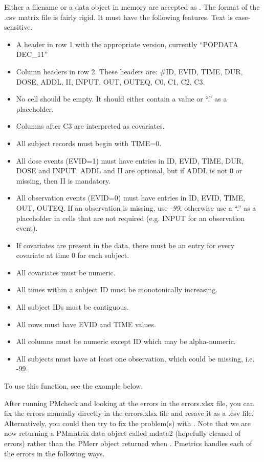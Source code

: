 \documentclass[a4paper]{book}
\begin{document}
\begin{Details}\relax
Either a filename or a data object in memory are accepted as .
The format of the .csv matrix file is fairly rigid.
It must have the following features.  Text is case-sensitive.
\begin{itemize}

\item{} A header in row 1 with the appropriate version, currently ``POPDATA DEC\_11''
\item{} Column headers in row 2.  These headers are: \#ID, EVID, TIME, DUR, DOSE, ADDL, II, INPUT, OUT, OUTEQ,
C0, C1, C2, C3.
\item{} No cell should be empty.  It should either contain a value or ``.'' as a placeholder.
\item{} Columns after C3 are interpreted as covariates.
\item{} All subject records must begin with TIME=0.
\item{} All dose events (EVID=1) must have entries in ID, EVID, TIME, DUR, DOSE and INPUT.  ADDL and II are optional, but if ADDL is not 0 or
missing, then II is mandatory.
\item{} All observation events (EVID=0) must have entries in ID, EVID, TIME, OUT, OUTEQ.
If an observation is missing, use \emph{-99}; otherwise use a ``.'' as a placeholder
in cells that are not required (e.g. INPUT for an observation event).
\item{} If covariates are present in the data, there must be an entry for every covariate at time 0 for each subject.
\item{} All covariates must be numeric.
\item{} All times within a subject ID must be monotonically increasing.
\item{} All subject IDs must be contiguous.
\item{} All rows must have EVID and TIME values.
\item{} All columns must be numeric except ID which may be alpha-numeric.
\item{} All subjects must have at least one observation, which could be missing, i.e. -99.

\end{itemize}


To use this function, see the example below.

After running PMcheck and looking at the errors in the errors.xlsx file, you can fix the
errors manually directly in the errors.xlsx file and resave it as a .csv file.
Alternatively, you could then try to fix the problem(s) with .  Note that we are now returning
a PMmatrix data object called mdata2 (hopefully cleaned of errors) rather than the PMerr object returned when .
Pmetrics handles each of the errors in the following ways.
\begin{itemize}


\end{itemize}
\end{Details}
\end{document}
